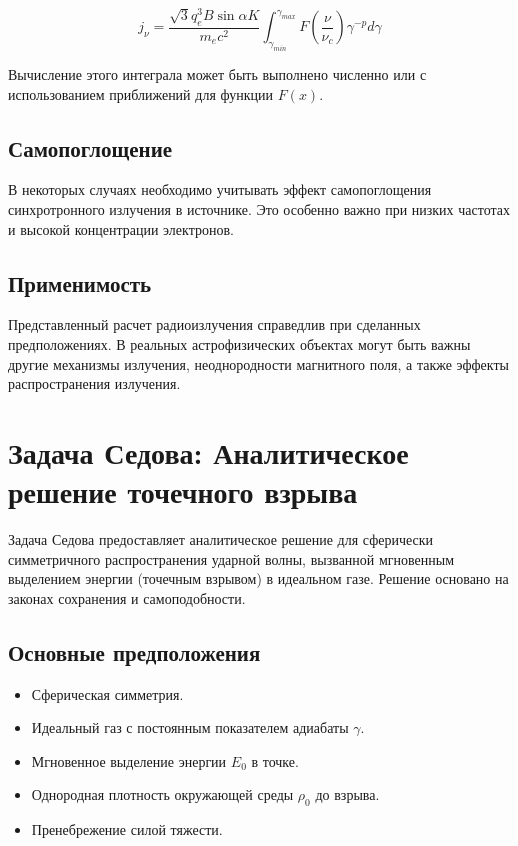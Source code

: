 \documentclass[a4paper,12pt]{extarticle}
\begin{document}
\begin{equation}
     j_\nu =  \frac{\sqrt{3} q_e^3 B \sin{\alpha} K}{m_e c^2} \int_{\gamma_{min}}^{\gamma_{max}} F\left(\frac{\nu}{\nu_c}\right) \gamma^{-p}  d\gamma
\end{equation}

Вычисление этого интеграла может быть выполнено численно или с использованием приближений для функции $F(x)$.

\subsection{Самопоглощение}
В некоторых случаях необходимо учитывать эффект самопоглощения синхротронного излучения в источнике.  Это особенно важно при низких частотах и высокой концентрации электронов.

\subsection{Применимость}

Представленный расчет радиоизлучения справедлив при сделанных предположениях.  В реальных астрофизических объектах могут быть важны другие механизмы излучения, неоднородности магнитного поля, а также эффекты распространения излучения.

\section{Задача Седова: Аналитическое решение точечного взрыва}

Задача Седова предоставляет аналитическое решение для сферически симметричного распространения ударной волны, вызванной мгновенным выделением энергии (точечным взрывом) в идеальном газе.  Решение основано на законах сохранения и самоподобности.

\subsection{Основные предположения}

\begin{itemize}
    \item Сферическая симметрия.
    \item Идеальный газ с постоянным показателем адиабаты $\gamma$.
    \item Мгновенное выделение энергии $E_0$ в точке.
    \item Однородная плотность окружающей среды $\rho_0$ до взрыва.
    \item Пренебрежение силой тяжести.
\end{itemize}
\end{document}
